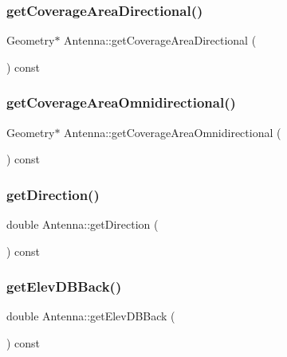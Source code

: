\subsubsection{\texorpdfstring{get\+Coverage\+Area\+Directional()}{getCoverageAreaDirectional()}}
{\footnotesize\ttfamily Geometry$\ast$ Antenna\+::get\+Coverage\+Area\+Directional (\begin{DoxyParamCaption}{ }\end{DoxyParamCaption}) const\hspace{0.3cm}{\ttfamily [private]}}

\mbox{\label{class_antenna_a24f459b9915a64fe140af16a2970a7e7}} 
\subsubsection{\texorpdfstring{get\+Coverage\+Area\+Omnidirectional()}{getCoverageAreaOmnidirectional()}}
{\footnotesize\ttfamily Geometry$\ast$ Antenna\+::get\+Coverage\+Area\+Omnidirectional (\begin{DoxyParamCaption}{ }\end{DoxyParamCaption}) const\hspace{0.3cm}{\ttfamily [private]}}

\mbox{\label{class_antenna_a76d97c4f0e2b8ad00c1dbedc1710673c}} 
\subsubsection{\texorpdfstring{get\+Direction()}{getDirection()}}
{\footnotesize\ttfamily double Antenna\+::get\+Direction (\begin{DoxyParamCaption}{ }\end{DoxyParamCaption}) const\hspace{0.3cm}{\ttfamily [private]}}

\mbox{\label{class_antenna_ae4abdaeb483291d0e11cbcc393a0f6a3}} 
\subsubsection{\texorpdfstring{get\+Elev\+D\+B\+Back()}{getElevDBBack()}}
{\footnotesize\ttfamily double Antenna\+::get\+Elev\+D\+B\+Back (\begin{DoxyParamCaption}{ }\end{DoxyParamCaption}) const\hspace{0.3cm}{\ttfamily [private]}}

